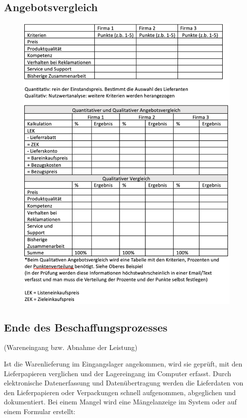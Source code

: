\documentclass[10pt]{article}
\begin{document}
\subsection{Angebotsvergleich}
\begin{figure}[H]
\begin{center}
  \includegraphics[width=12cm]{QuantitativUndQualitativerAngebotsvergleich.png}
  \end{center}
  \label{fig:QuantitativUndQualitativerAngebotsvergleich.png}
\end{figure}

\subsection{Ende des Beschaffungsprozesses}
(Wareneingang bzw. Abnahme der Leistung)

Ist die Warenlieferung im Eingangslager angekommen, wird sie geprüft, mit den Lieferpapieren verglichen und der Lagereingang im Computer erfasst. Durch elektronische Datenerfassung und Datenübertragung werden die Lieferdaten von den Lieferpapieren oder Verpackungen schnell aufgenommen, abgeglichen und dokumentiert. Bei einem Mangel wird eine Mängelanzeige im System oder auf einem Formular erstellt:
\end{document}
